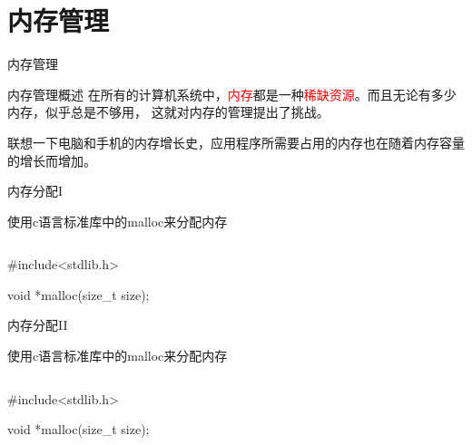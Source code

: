 \documentclass{beamer}
\begin{document}
\section{内存管理}
\begin{frame}
\Huge{\centerline{内存管理}}
\end{frame}
\begin{frame}{内存管理概述}
在所有的计算机系统中，\textcolor{red}{内存}都是一种\textcolor{red}{稀缺资源}。而且无论有多少内存，似乎总是不够用，
这就对内存的管理提出了挑战。

联想一下电脑和手机的内存增长史，应用程序所需要占用的内存也在随着内存容量的增长而增加。

\end{frame}
\begin{frame}[fragile]{内存分配I}
\begin{block}{使用c语言标准库中的malloc来分配内存}
\begin{lstlisting}
\end{lstlisting}
\#include<stdlib.h>

void *malloc(size\_t size);
\end{block}
\end{frame}
\begin{frame}[fragile]{内存分配II}
\begin{block}{使用c语言标准库中的malloc来分配内存}
\begin{lstlisting}
\end{lstlisting}
\#include<stdlib.h>

void *malloc(size\_t size);
\end{block}
\end{frame}
\end{document}
